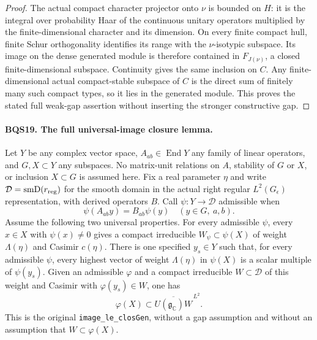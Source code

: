 \begin{proof}
The actual compact character projector onto $\nu$ is bounded on
$H$: it is the integral over probability Haar of the continuous
unitary operators multiplied by the finite-dimensional character
and its dimension.  On every finite compact hull, finite
Schur orthogonality identifies its range with the $\nu$-isotypic
subspace.  Its image on the dense generated module is therefore
contained in $F_{J(\nu)}$, a closed finite-dimensional subspace.
Continuity gives the same inclusion on $C$.
Any finite-dimensional actual compact-stable subspace of $C$ is
the direct sum of finitely many such compact types, so it lies
in the generated module.  This proves the stated full weak-gap
assertion without inserting the stronger constructive gap.
\end{proof}

\paragraph{BQS19. The full universal-image closure lemma.}
\label{claim:BQS19}
Let $Y$ be any complex vector space, $A_{ab}\in\operatorname{End}Y$
any family of linear operators, and $G,X\subset Y$ any subspaces.
No matrix-unit relations on $A$, stability of $G$ or $X$, or inclusion
$X\subset G$ is assumed here.
Fix a real parameter $\eta$ and write
$\mathcal D=\operatorname{smD}(r_{\rm reg})$ for the smooth domain
in the actual right regular $L^2(G_\epsilon)$ representation, with
derived operators $B$.
Call $\psi:Y\to\mathcal D$ admissible when
\[
               \psi(A_{ab}y)=B_{ab}\psi(y)
                            \quad(y\in G,\ a,b).
 \tag{BQS.52}
\]
Assume the following two universal properties.
For every admissible $\psi$, every $x\in X$ with $\psi(x)\ne0$
gives a compact irreducible $W_\psi\subset\psi(X)$ of weight
$\Lambda(\eta)$ and Casimir $c(\eta)$.
There is one specified $y_s\in Y$ such that, for every admissible
$\psi$, every highest vector of weight $\Lambda(\eta)$ in $\psi(X)$
is a scalar multiple of $\psi(y_s)$.
Given an admissible $\varphi$ and a compact irreducible
$W\subset\mathcal D$ of this weight and Casimir with
$\varphi(y_s)\in W$, one has
\[
       \varphi(X)\subset
       \overline{U(\mathfrak g_{\mathbb C})W}^{\,L^2}.
 \tag{BQS.53}
\]
This is the original \texttt{image\_le\_closGen}, without a gap
assumption and without an assumption that $W\subset\varphi(X)$.

